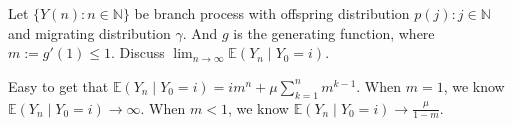 \documentclass[../main]{subfiles}
\begin{document}
\begin{problem}\label{pro:6}
  Let \(\{Y(n): n \in \mathbb{N}\}\) be branch process with offspring distribution \(p(j): j \in \mathbb{N}\) and migrating distribution \(\gamma\).
  And \(g\) is the generating function, where \(m :=g' (1) \leq 1\).
  Discuss \(\lim_{n \to \infty}\mathbb{E}(Y_n \mid Y_0=i)\).
\end{problem}
\begin{solution}
  Easy to get that \(\mathbb{E}(Y_n \mid Y_0=i)=im^n+\mu \sum_{k=1}^{n} m^{k-1}\).
  When \(m=1\), we know \(\mathbb{E}(Y_n \mid Y_0=i) \to \infty\).
  When \(m<1\), we know \(\mathbb{E}(Y_n \mid Y_0=i)\to \frac{\mu}{1-m}\).
\end{solution}
\end{document}

